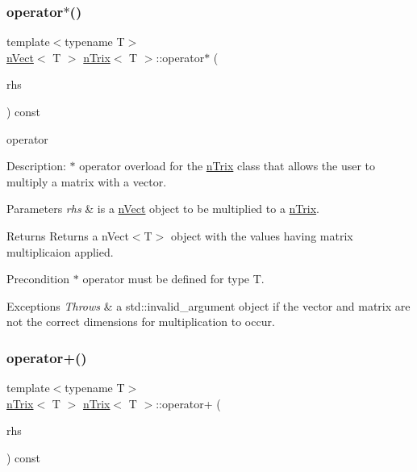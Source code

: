 \subsubsection{\texorpdfstring{operator$\ast$()}{operator*()}\hspace{0.1cm}{\footnotesize\ttfamily [2/2]}}
{\footnotesize\ttfamily template$<$typename T$>$ \\
\hyperlink{classnVect}{n\+Vect}$<$ T $>$ \hyperlink{classnTrix}{n\+Trix}$<$ T $>$\+::operator$\ast$ (\begin{DoxyParamCaption}\item[{const \hyperlink{classnVect}{n\+Vect}$<$ T $>$ \&}]{rhs }\end{DoxyParamCaption}) const}




\begin{DoxyItemize}
\item operator 
\end{DoxyItemize}

Description\+: $\ast$ operator overload for the \hyperlink{classnTrix}{n\+Trix} class that allows the user to multiply a matrix with a vector. 
\begin{DoxyParams}{Parameters}
{\em rhs} & is a \hyperlink{classnVect}{n\+Vect} object to be multiplied to a \hyperlink{classnTrix}{n\+Trix}. \\
\hline
\end{DoxyParams}
\begin{DoxyReturn}{Returns}
Returns a n\+Vect$<$\+T$>$ object with the values having matrix multiplicaion applied. 
\end{DoxyReturn}
\begin{DoxyPrecond}{Precondition}
$\ast$ operator must be defined for type T. 
\end{DoxyPrecond}

\begin{DoxyExceptions}{Exceptions}
{\em Throws} & a std\+::invalid\+\_\+argument object if the vector and matrix are not the correct dimensions for multiplication to occur. \\
\hline
\end{DoxyExceptions}
\mbox{\label{classnTrix_aacf51597babef6c97ba7101066f84157}} 
\subsubsection{\texorpdfstring{operator+()}{operator+()}}
{\footnotesize\ttfamily template$<$typename T$>$ \\
\hyperlink{classnTrix}{n\+Trix}$<$ T $>$ \hyperlink{classnTrix}{n\+Trix}$<$ T $>$\+::operator+ (\begin{DoxyParamCaption}\item[{const \hyperlink{classnTrix}{n\+Trix}$<$ T $>$ \&}]{rhs }\end{DoxyParamCaption}) const}





